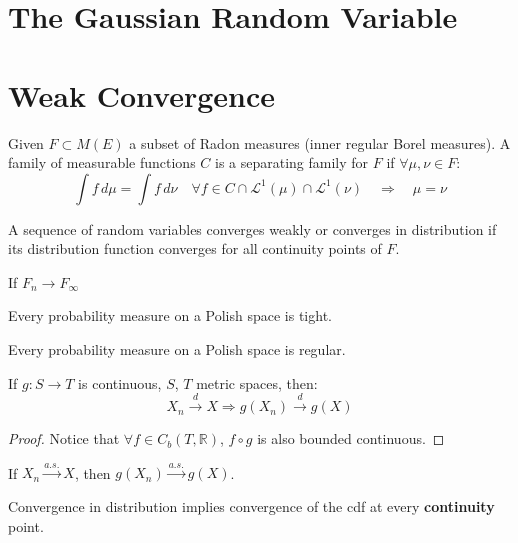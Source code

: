 \section{The Gaussian Random Variable}



\section{Weak Convergence}
\begin{definition}
	Given $F \subset M(E)$ a subset of Radon measures (inner regular Borel measures). A family of measurable functions $C$ is a separating family for $F$ if $\forall \mu, \nu \in F$:
	\begin{equation*}
		\int f \, d\mu = \int f \, d\nu \quad \forall f \in C \cap \mathcal{L}^1(\mu) \cap \mathcal{L}^1(\nu) \quad \Rightarrow \quad \mu = \nu
	\end{equation*}
\end{definition}

\begin{definition}

\end{definition}


\begin{definition}
	A sequence of random variables converges weakly or converges in distribution if its distribution function converges for all continuity points of $F$.
\end{definition}

\begin{theorem}
	If $F_n \rightarrow F_\infty$
\end{theorem}

\begin{theorem}
	Every probability measure on a Polish space is tight.
\end{theorem}

\begin{theorem}
	Every probability measure on a Polish space is regular.
\end{theorem}

\begin{theorem}
	If $g: S \rightarrow T$ is continuous, $S$, $T$ metric spaces, then:
	\begin{equation*}
		X_n \overset{d}{\rightarrow} X \Rightarrow g(X_n) \overset{d}{\rightarrow} g(X)
	\end{equation*}
\end{theorem}
\begin{proof}
	Notice that $\forall f \in C_b(T, \mathbb{R})$, $f\circ g$ is also bounded continuous.
\end{proof}
\begin{remark}
If $X_n \overset{a.s.}{\longrightarrow} X$, then $g(X_n) \overset{a.s.}{\longrightarrow} g(X)$.
\end{remark}

\begin{theorem}
	Convergence in distribution implies convergence of the cdf at every \textbf{continuity} point.
\end{theorem}
